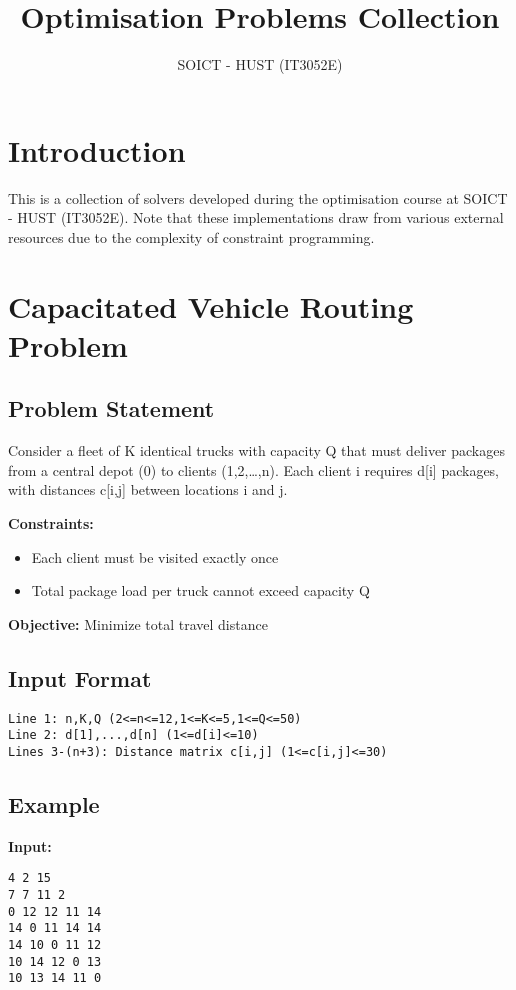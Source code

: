 \documentclass{article}
\begin{document}
\title{Optimisation Problems Collection}
\author{SOICT - HUST (IT3052E)}
\maketitle

\section{Introduction}
This is a collection of solvers developed during the optimisation course at SOICT - HUST (IT3052E). Note that these implementations draw from various external resources due to the complexity of constraint programming.

\section{Capacitated Vehicle Routing Problem}

\subsection{Problem Statement}
Consider a fleet of K identical trucks with capacity Q that must deliver packages from a central depot (0) to clients (1,2,\ldots,n). Each client i requires d[i] packages, with distances c[i,j] between locations i and j.

\textbf{Constraints:}
\begin{itemize}
    \item Each client must be visited exactly once
    \item Total package load per truck cannot exceed capacity Q
\end{itemize}

\textbf{Objective:} Minimize total travel distance

\subsection{Input Format}
\begin{verbatim}
Line 1: n,K,Q (2<=n<=12,1<=K<=5,1<=Q<=50)
Line 2: d[1],...,d[n] (1<=d[i]<=10)
Lines 3-(n+3): Distance matrix c[i,j] (1<=c[i,j]<=30)
\end{verbatim}

\subsection{Example}
\textbf{Input:}
\begin{verbatim}
4 2 15
7 7 11 2
0 12 12 11 14
14 0 11 14 14
14 10 0 11 12
10 14 12 0 13
10 13 14 11 0
\end{verbatim}
\end{document}

